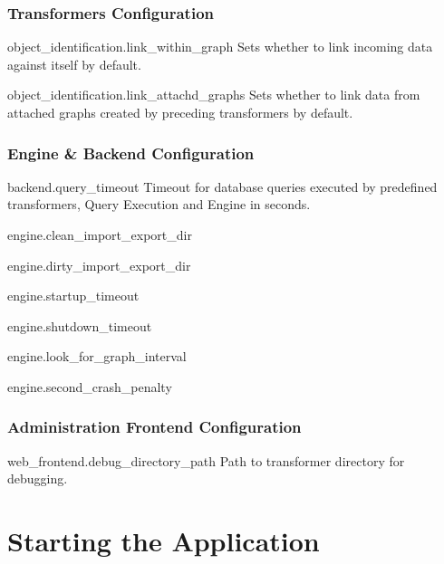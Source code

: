 \subsection*{Transformers Configuration}
\begin{configlist}
	\item[object\_identification.link\_within\_graph]
		Sets whether to link incoming data against itself by default.
	\item[object\_identification.link\_attachd\_graphs]
		Sets whether to link data from attached graphs created by preceding transformers by default.
\end{configlist}

\subsection*{Engine \& Backend Configuration}
\begin{configlist}
	\item[backend.query\_timeout]
		Timeout for database queries executed by predefined transformers, Query Execution and Engine in seconds.

	\item[engine.clean\_import\_export\_dir]
	\item[engine.dirty\_import\_export\_dir]
	\item[engine.startup\_timeout]
	\item[engine.shutdown\_timeout]
	\item[engine.look\_for\_graph\_interval]
	\item[engine.second\_crash\_penalty]
\end{configlist}

\subsection*{Administration Frontend Configuration}
\begin{configlist}

	\item[web\_frontend.debug\_directory\_path]
		Path to transformer directory for debugging.
\end{configlist}


\chapter{Starting the Application}

